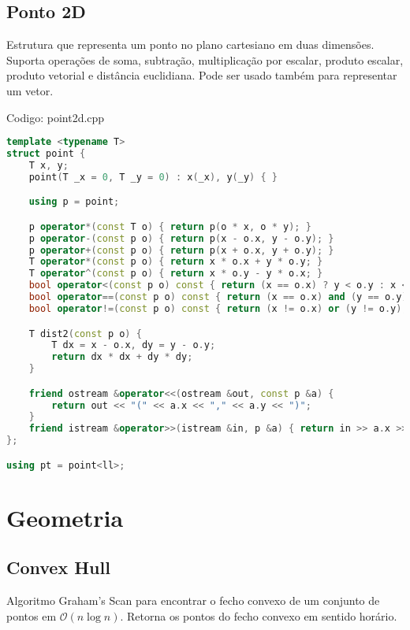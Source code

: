 \documentclass[10pt, a4paper, oneside]{book}
\begin{document}
\section{Ponto 2D}


Estrutura que representa um ponto no plano cartesiano em duas dimensões. Suporta operações de soma, subtração, multiplicação por escalar, produto escalar, produto vetorial e distância euclidiana. Pode ser usado também para representar um vetor.

\hfill

Codigo: point2d.cpp

\begin{lstlisting}[language=C++]
template <typename T>
struct point {
    T x, y;
    point(T _x = 0, T _y = 0) : x(_x), y(_y) { }

    using p = point;

    p operator*(const T o) { return p(o * x, o * y); }
    p operator-(const p o) { return p(x - o.x, y - o.y); }
    p operator+(const p o) { return p(x + o.x, y + o.y); }
    T operator*(const p o) { return x * o.x + y * o.y; }
    T operator^(const p o) { return x * o.y - y * o.x; }
    bool operator<(const p o) const { return (x == o.x) ? y < o.y : x < o.x; }
    bool operator==(const p o) const { return (x == o.x) and (y == o.y); }
    bool operator!=(const p o) const { return (x != o.x) or (y != o.y); }

    T dist2(const p o) {
        T dx = x - o.x, dy = y - o.y;
        return dx * dx + dy * dy;
    }

    friend ostream &operator<<(ostream &out, const p &a) {
        return out << "(" << a.x << "," << a.y << ")";
    }
    friend istream &operator>>(istream &in, p &a) { return in >> a.x >> a.y; }
};

using pt = point<ll>;\end{lstlisting}
\hfill

\newpage

%
%
%
%

\chapter{Geometria}

\section{Convex Hull}


Algoritmo Graham's Scan para encontrar o fecho convexo de um conjunto de pontos em $\mathcal{O}(n \log n)$. Retorna os pontos do fecho convexo em sentido horário.
\end{document}
